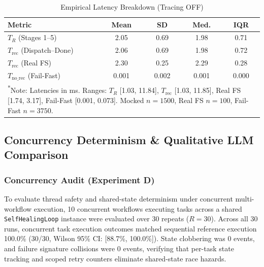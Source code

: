 \documentclass[conference]{IEEEtran}
\newcommand{\chg}[1]{{\color{blue}#1}}
\begin{document}
\begin{table}[t]
\centering
\caption{\chg{Empirical Latency Breakdown (Tracing OFF)}}
\label{tab:latency_breakdown}
\footnotesize
\begin{tabularx}{\columnwidth}{Xcccc}
\toprule
\chg{\textbf{Metric}} & \chg{\textbf{Mean}} & \chg{\textbf{SD}} & \chg{\textbf{Med.}} & \chg{\textbf{IQR}} \\
\midrule
\chg{$T_R$ (Stages 1--5)} & \chg{2.05} & \chg{0.69} & \chg{1.98} & \chg{0.71} \\
\chg{$T_{\text{rec}}$ (Dispatch--Done)} & \chg{2.06} & \chg{0.69} & \chg{1.98} & \chg{0.72} \\
\chg{$T_{\text{rec}}$ (Real FS)} & \chg{2.30} & \chg{0.25} & \chg{2.29} & \chg{0.28} \\
\chg{$T_{\text{no\_rec}}$ (Fail-Fast)} & \chg{0.001} & \chg{0.002} & \chg{0.001} & \chg{0.000} \\
\bottomrule
\multicolumn{5}{p{0.95\columnwidth}}{\chg{\textsuperscript{*}Note: Latencies in ms. Ranges: $T_R$ [1.03, 11.84], $T_{\text{rec}}$ [1.03, 11.85], Real FS [1.74, 3.17], Fail-Fast [0.001, 0.073]. Mocked $n=1500$, Real FS $n=100$, Fail-Fast $n=3750$.}}
\end{tabularx}
\end{table}

\subsection{\chg{Concurrency Determinism \& Qualitative LLM Comparison}}
\subsubsection{\chg{Concurrency Audit (Experiment D)}}
\chg{To evaluate thread safety and shared-state determinism under concurrent multi-workflow execution, 10 concurrent workflows executing tasks across a shared \texttt{SelfHealingLoop} instance were evaluated over 30 repeats ($R=30$). Across all 30 runs, concurrent task execution outcomes matched sequential reference execution 100.0\% (30/30, Wilson 95\% CI: [88.7\%, 100.0\%]). State clobbering was 0 events, and failure signature collisions were 0 events, verifying that per-task state tracking and scoped retry counters eliminate shared-state race hazards.}
\end{document}
